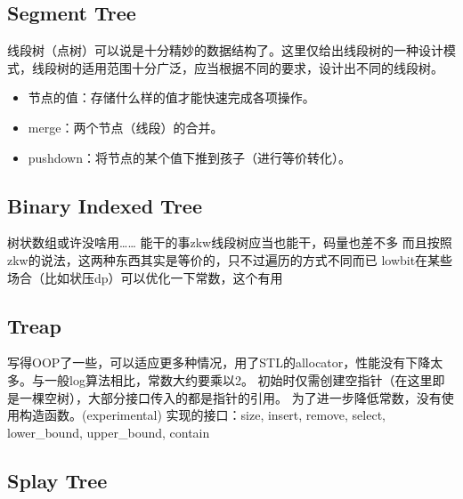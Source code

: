 \documentclass[twoside, UTF8]{article}
\begin{document}
		\subsection{Segment Tree}
			\begin{flushleft}
				线段树（点树）可以说是十分精妙的数据结构了。这里仅给出线段树的一种设计模式，线段树的适用范围十分广泛，应当根据不同的要求，设计出不同的线段树。
				\begin{itemize}
					\item 节点的值：存储什么样的值才能快速完成各项操作。
					\item merge：两个节点（线段）的合并。
					\item pushdown：将节点的某个值下推到孩子（进行等价转化）。
				\end{itemize}
			\end{flushleft}
			
		\subsection{Binary Indexed Tree}
			\begin{flushleft}
				树状数组或许没啥用……
				\linebreak 能干的事zkw线段树应当也能干，码量也差不多
				\linebreak 而且按照zkw的说法，这两种东西其实是等价的，只不过遍历的方式不同而已
				\linebreak lowbit在某些场合（比如状压dp）可以优化一下常数，这个有用
			\end{flushleft}
			
		\subsection{Treap}
			\begin{flushleft}
				写得OOP了一些，可以适应更多种情况，用了STL的allocator，性能没有下降太多。与一般log算法相比，常数大约要乘以2。
				\linebreak 初始时仅需创建空指针（在这里即是一棵空树），大部分接口传入的都是指针的引用。
				\linebreak 为了进一步降低常数，没有使用构造函数。(experimental)
				\linebreak 实现的接口：size, insert, remove, select, lower\_bound, upper\_bound, contain
			\end{flushleft}
			
		\subsection{Splay Tree}
			
	\newpage
\end{document}
